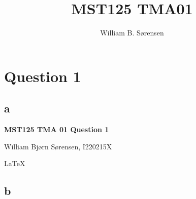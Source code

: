\documentclass{article}
\author{William B. Sørensen}
\title{MST125 TMA01}
\begin{document}
\maketitle

\section{Question 1}

\tableofcontents

\subsection{a}

\begin{center}
	\textbf {MST125 TMA 01 Question 1}

	William Bjørn Sørensen, I220215X

	\LaTeX
\end{center}

\subsection{b}
\end{document}
